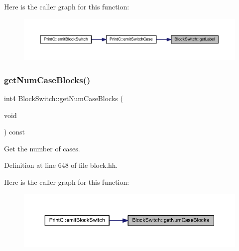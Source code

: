 Here is the caller graph for this function\+:
\nopagebreak
\begin{figure}[H]
\begin{center}
\leavevmode
\includegraphics[width=350pt]{class_block_switch_a96c22ddffa4cc1b28ad0a1942d9b7524_icgraph}
\end{center}
\end{figure}
\mbox{\label{class_block_switch_aabd55152ee939db1ac6c46e7493f26e1}} 
\subsubsection{\texorpdfstring{getNumCaseBlocks()}{getNumCaseBlocks()}}
{\footnotesize\ttfamily int4 Block\+Switch\+::get\+Num\+Case\+Blocks (\begin{DoxyParamCaption}\item[{void}]{ }\end{DoxyParamCaption}) const\hspace{0.3cm}{\ttfamily [inline]}}



Get the number of cases. 



Definition at line 648 of file block.\+hh.

Here is the caller graph for this function\+:
\nopagebreak
\begin{figure}[H]
\begin{center}
\leavevmode
\includegraphics[width=350pt]{class_block_switch_aabd55152ee939db1ac6c46e7493f26e1_icgraph}
\end{center}
\end{figure}
\mbox{\label{class_block_switch_af7731cebe7c26c9de45a45b0f821738a}} 
